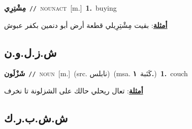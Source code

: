 \documentclass[10pt,a4paper,twoside]{article} %
\begin{document}
\begin{multicols}{2}
{\setlength\topsep{0pt}\textbf{\foreignlanguage{arabic}{مِشْتِرِي}}\ {\color{gray}\texttt{//}\color{black}}\ \textsc{noun\textunderscore act}\ [m.]\ \textbf{1.}~buying\  \begin{flushright}\color{gray}\foreignlanguage{arabic}{\textbf{\underline{\foreignlanguage{arabic}{أمثلة}}}: بقيت مِشْتِرِيلي قطعة أرض أبو دنمين بكفر عبوش}\end{flushright}\color{black}} \vspace{2mm}

\vspace{-3mm}
\subsection*{\color{blue}\foreignlanguage{arabic}{ش.ز.ل.و.ن}\color{blue}{ (ntws)}} 

{\setlength\topsep{0pt}\textbf{\foreignlanguage{arabic}{شَزْلَون}}\ {\color{gray}\texttt{//}\color{black}}\ \textsc{noun}\ [m.]\ (src. \color{gray}\foreignlanguage{arabic}{نابلس}\color{black})\ \color{gray}(msa. \foreignlanguage{arabic}{كَنَبة}~\foreignlanguage{arabic}{\textbf{١.}})\color{black}\ \textbf{1.}~couch\  \begin{flushright}\color{gray}\foreignlanguage{arabic}{\textbf{\underline{\foreignlanguage{arabic}{أمثلة}}}: تعال ريحلي حالك على الشزلونة تا نخرف}\end{flushright}\color{black}} \vspace{2mm}

\vspace{-3mm}
\subsection*{\color{blue}\foreignlanguage{arabic}{ش.ش.ب.ر.ك}\color{blue}{ (ntws)}} 


\end{multicols}
\end{document}

